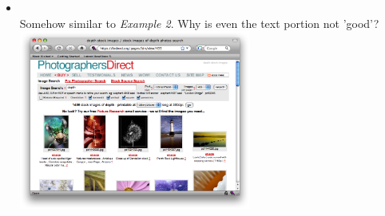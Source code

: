 \documentclass[12pt,a4paper]{article}
\begin{document}
\begin{itemize}
\item {} \\
Somehow similar to \emph{Example 2}. Why is even the text portion not 'good'? \\
\includegraphics[width=0.6\textwidth]{images/435.png} \\

\end{itemize}
\end{document}
